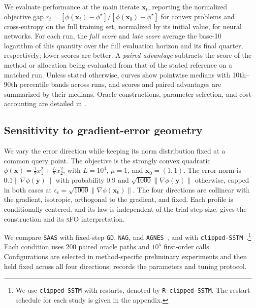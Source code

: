 \documentclass{article}
\begin{document}
We evaluate performance at the main iterate \(\bm{x}_t\), reporting
the normalized objective gap
\(r_t=[\phi(\bm{x}_t)-\phi^\star]/
[\phi(\bm{x}_0)-\phi^\star]\)
for convex problems and cross-entropy on the full training set,
normalized by its initial value, for neural networks. For each run,
the \emph{full score} and \emph{late score} average the base-10 logarithm
of this quantity over the full evaluation horizon and its final quarter,
respectively; lower scores are better. A \emph{paired advantage}
subtracts the score of the method or allocation being evaluated from
that of the stated reference on a matched run. Unless stated otherwise,
curves show pointwise medians with 10th--90th percentile bands across
runs, and scores and paired advantages are summarized by their medians.
Oracle constructions, parameter selection, and cost accounting are
detailed in .

\subsection{Sensitivity to gradient-error geometry}
\label{subsec:exp_noise_geometry}

We vary the error direction while keeping its norm distribution fixed
at a common query point. The objective is the strongly convex quadratic
\(\phi(\bm{x})=\tfrac12x_1^2+\tfrac L2x_2^2\), with
\(L=10^4\), \(\mu=1\), and \(\bm{x}_0=(1,1)\). The error norm is
\(0.1\|\nabla\phi(\bm{y})\|\) with probability 0.9 and
\(\sqrt{1000}\|\nabla\phi(\bm{y})\|\) otherwise, capped in both cases at
\(\epsilon_{\mathrm{c}}=\sqrt{1000}\|\nabla\phi(\bm{x}_0)\|\).
The four directions are collinear with the gradient, isotropic,
orthogonal to the gradient, and fixed. Each profile is conditionally
centered, and its law is independent of the trial step size.
 gives the construction and its
\textsc{sFO} interpretation.

We compare \texttt{SAAS} with fixed-step \texttt{GD}, \texttt{NAG},
and \texttt{AGNES}~\cite{gupta2024nesterovaccelerationdespitenoisy},
and with \texttt{clipped-SSTM}~\cite{gorbunov2020accelerated}.\footnote{We use
\texttt{clipped-SSTM} with restarts, denoted by \texttt{R-clipped-SSTM}.
The restart schedule for each study is given in the appendix.}
Each condition uses 200 paired oracle paths and \(10^5\) first-order
calls. Configurations are selected in method-specific preliminary
experiments and then held fixed across all four directions;
 records the parameters and tuning protocol.
\end{document}
